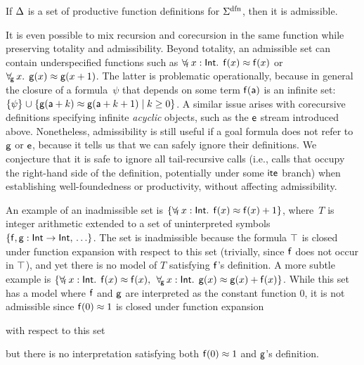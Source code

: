 \begin{theorem}\label{thm:adm-co}
If $\DDD$ is a set of productive function definitions for\/
$\sfundefs{\Sigma}$, then it is admissible.
\end{theorem}


\newcommand\badassex{
 \{\forallf{\con{f}} x : \typeint.\;\, \con{f}( x ) \teq \con{f}( x ),\allowbreak\;\,
 \forallf{\con{g}} x : \typeint.\;\, \con{g}( x ) \teq \con{g}( x ) + \nobreak\con{f}( x )\}}

It is even possible to mix recursion and corecursion in the same function
\cite{blanchette-et-al-2015-fouco} while preserving totality and admissibility.
Beyond totality, an admissible set can contain underspecified functions
such as $\forall_{\!\mathsf{f}\:} x : \mathsf{Int}.\allowbreak\;\, \mathsf{f}( x )
\approx \mathsf{f}( x )$ or $\forall_{\!\mathsf{g}\:} x.\allowbreak\;\, \mathsf{g}( x
) \approx \mathsf{g}( x + 1 )$. The latter is problematic operationally, because
in general the closure of a formula~$\psi$ that depends on some term
$\mathsf{f}(\mathsf{a})$ is an infinite set:
$\{\psi\} \cup \{\con {g}(\con{a}+k) \teq \con {g}(\con{a}+k+1) \mid k \geq 0\}$.
A similar issue arises with corecursive definitions specifying infinite
\emph{acyclic} objects, such as the $\mathsf{e}$ stream introduced above.
Nonetheless, admissibility is still useful if a goal formula does not refer to
$\mathsf{g}$ or $\mathsf{e}$, because it tells us that we can safely ignore their
definitions.
%
We conjecture that it is safe to ignore all tail-recursive calls (i.e., calls that
occupy the right-hand side of the definition, potentially under some $\mathsf{ite}$
branch) when establishing well-foundedness or productivity, without affecting
admissibility.

An example of an inadmissible set is
$\{ \forall_{\!\mathsf{f}\:} x : \mathsf{Int}.\;\, \mathsf{f}( x ) \approx \mathsf{f}( x ) + 1 \}$,
where~$T$ is integer arithmetic extended to a set of uninterpreted symbols
$\{\mathsf{f}, \mathsf{g} :\mathsf{Int} \rightarrow \mathsf{Int},\, \ldots \}$.
The set is inadmissible because the formula $\top$ is
closed under function expansion with respect to this set
(trivially, since $\mathsf{f}$ does not occur in $\top$),
and yet there is no model of $T$
satisfying $\mathsf{f}$'s definition. A more subtle example is
$\badassex$.
While this set has a model where $\mathsf{f}$ and $\mathsf{g}$ are interpreted as the
constant function $0$, it is not admissible since %
$\mathsf{f}( 0 ) \approx 1$ is
closed under function expansion \begin{rep}with respect to this set\end{rep}
but there is no interpretation satisfying both $\mathsf{f}( 0 ) \approx 1$ and $\mathsf{g}$'s
definition.

